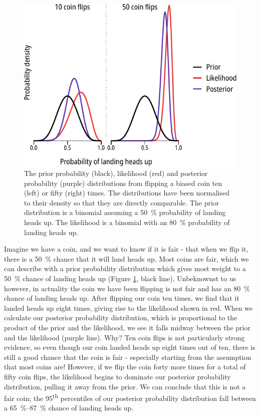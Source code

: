 \begin{figure}
	\centering
	\includegraphics[width=\textwidth]{coinflip_bayes.pdf}
	\caption[Flipping a coin - illustrating Bayesian analysis]{
		{\bf{}}
		The prior probability (black), likelihood (red) and posterior probability (purple) distributions from flipping a biased coin ten (left) or fifty (right) times.
		The distributions have been normalised to their density so that they are directly comparable.
		The prior distribution is a binomial assuming a \SI{50}{\percent} probability of landing heads up.
		The likelihood is a binomial with an \SI{80}{\percent} probability of landing heads up.
	}\label{ch2fig:coinflip}
\end{figure}

Imagine we have a coin, and we want to know if it is fair - that when we flip it, there is a \SI{50}{\percent} chance that it will land heads up.
Most coins are fair, which we can describe with a prior probability distribution which gives most weight to a \SI{50}{\percent} chance of landing heads up (Figure \ref{ch2fig:coinflip}, black line).
Unbeknownst to us however, in actuality the coin we have been flipping is not fair and has an \SI{80}{\percent} chance of landing heads up.
After flipping our coin ten times, we find that it landed heads up eight times, giving rise to the likelihood shown in red.
When we calculate our posterior probability distribution, which is proportional to the product of the prior and the likelihood, we see it falls midway between the prior and the likelihood (purple line).
Why?
Ten coin flips is not particularly strong evidence, so even though our coin landed heads up eight times out of ten, there is still a good chance that the coin is fair - especially starting from the assumption that most coins are!
However, if we flip the coin forty more times for a total of fifty coin flips, the likelihood begins to dominate our posterior probability distribution, pulling it away from the prior.
We can conclude that this is not a fair coin; the 95\textsuperscript{th} percentiles of our posterior probability distribution fall between a \SIrange{65}{87}{\percent} chance of landing heads up.

